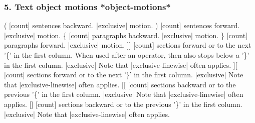 \documentclass{beamer}
\begin{document}
\begin{frame}
  \frametitle{5. Text object motions                    *object-motions*}
  (         [count] sentences backward.  |exclusive| motion.
  )         [count] sentences forward.  |exclusive| motion.
  \{            [count] paragraphs backward.  |exclusive| motion.
  \}            [count] paragraphs forward.  |exclusive| motion.
]]          [count] sections forward or to the next '\{' in the
  first column.  When used after an operator, then also
stops below a '\}' in the first column.  |exclusive|
Note that |exclusive-linewise| often applies.
][          [count] sections forward or to the next '\}' in the
first column.  |exclusive|
Note that |exclusive-linewise| often applies.
[[          [count] sections backward or to the previous '\{' in
      the first column.  |exclusive|
      Note that |exclusive-linewise| often applies.
    []          [count] sections backward or to the previous '\}' in
    the first column.  |exclusive|
    Note that |exclusive-linewise| often applies.
\end{frame}
\end{document}
